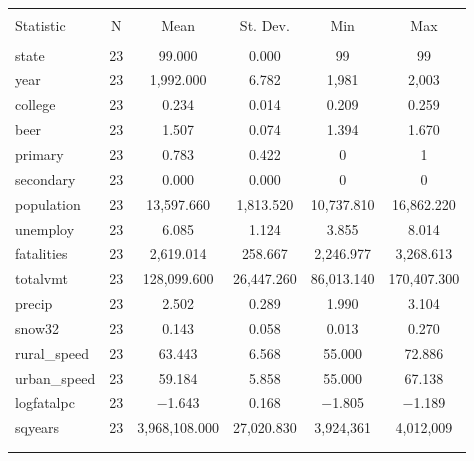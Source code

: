\documentclass{article}
\begin{document}
\begin{table}[!htbp] \centering 
  \caption{} 
  \label{} 
\begin{tabular}{@{\extracolsep{5pt}}lccccc} 
\\[-1.8ex]\hline 
\hline \\[-1.8ex] 
Statistic & \multicolumn{1}{c}{N} & \multicolumn{1}{c}{Mean} & \multicolumn{1}{c}{St. Dev.} & \multicolumn{1}{c}{Min} & \multicolumn{1}{c}{Max} \\ 
\hline \\[-1.8ex] 
state & 23 & 99.000 & 0.000 & 99 & 99 \\ 
year & 23 & 1,992.000 & 6.782 & 1,981 & 2,003 \\ 
college & 23 & 0.234 & 0.014 & 0.209 & 0.259 \\ 
beer & 23 & 1.507 & 0.074 & 1.394 & 1.670 \\ 
primary & 23 & 0.783 & 0.422 & 0 & 1 \\ 
secondary & 23 & 0.000 & 0.000 & 0 & 0 \\ 
population & 23 & 13,597.660 & 1,813.520 & 10,737.810 & 16,862.220 \\ 
unemploy & 23 & 6.085 & 1.124 & 3.855 & 8.014 \\ 
fatalities & 23 & 2,619.014 & 258.667 & 2,246.977 & 3,268.613 \\ 
totalvmt & 23 & 128,099.600 & 26,447.260 & 86,013.140 & 170,407.300 \\ 
precip & 23 & 2.502 & 0.289 & 1.990 & 3.104 \\ 
snow32 & 23 & 0.143 & 0.058 & 0.013 & 0.270 \\ 
rural\_speed & 23 & 63.443 & 6.568 & 55.000 & 72.886 \\ 
urban\_speed & 23 & 59.184 & 5.858 & 55.000 & 67.138 \\ 
logfatalpc & 23 & $-$1.643 & 0.168 & $-$1.805 & $-$1.189 \\ 
sqyears & 23 & 3,968,108.000 & 27,020.830 & 3,924,361 & 4,012,009 \\ 
\hline \\[-1.8ex] 
\normalsize 
\end{tabular} 
\end{table} 
\end{document}
